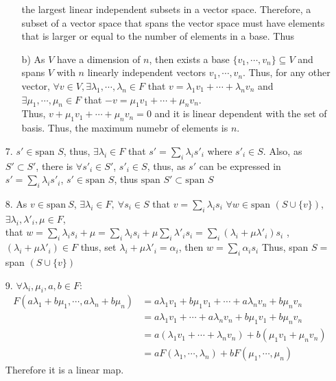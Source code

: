 \documentclass{article}
\begin{document}
\begin{itemize}
\begin{itemize}
    the largest linear independent subsets in a vector space. Therefore, a subset of a vector space that spans the vector space must have elements that is larger or equal to the
    number of elements in a base. Thus
    \item [b)] As \(V\) have a dimension of \(n\), then exists a base \(\{v_1,\cdots,v_n\}\subseteq V\) and spans \(V\) with \(n\) linearly independent vectors \(v_1,\cdots,v_n\).
    Thus, for any other vector, \(\forall v\in V,\exists \lambda_1,\cdots,\lambda_n\in F\) that \(v=\lambda_1v_1+\cdots+\lambda_nv_n\)
    and \(\exists \mu_1,\cdots,\mu_n\in F\) that \(-v=\mu_1v_1+\cdots+\mu_nv_n\).\\ Thus, \(v+\mu_1v_1+\cdots+\mu_nv_n=0\) and it is linear dependent with the set of basis. Thus, the maximum numebr of elements is \(n\).

\end{itemize}
    \item [7.] \(s' \in \text{span }S\), thus, \(\exists \lambda_i\in F\) that \(s' = \sum_i\lambda_i s'_i\) where \(s'_i\in S\). Also, as \(S'\subset S'\), there is \(\forall s'_i\in S'\), \(s'_i\in S\), thus, as \(s'\)
    can be expressed in \(s' = \sum_i\lambda_i s'_i\), \(s'\in \text{span }S\), thus \(\text{span }S'\subset\text{span }S\)
    \item [8.] As \(v\in \text{span}  \ S\), \(\exists \lambda_i\in F,\ \forall s_i \in S\) that \(v = \sum_i \lambda_is_i\)
    \(\forall w\in \text{span } (S\cup \{v\})\), \(\exists \lambda_i,\lambda'_i,\mu\in F\), \\
    that \(w=\sum_i\lambda_is_i + \mu  = \sum_i\lambda_is_i+\mu\sum_i\lambda'_is_i=\sum_i(\lambda_i+\mu\lambda'_i)s_i\)
    , \((\lambda_i+\mu\lambda'_i)\in F\) thus, set \(\lambda_i+\mu\lambda'_i=\alpha_i\), then \(w = \sum_i \alpha_is_i\) Thus, span \(S=\)span \((S\cup \{v\})\)
    
    \item [9.] \(\forall \lambda_i,\mu_i,a,b\in F\):
    \begin{align*}
        F(a\lambda_1+b\mu_1,\cdots,a\lambda_n+b\mu_n)&=a\lambda_1v_1+b\mu_1v_1+\cdots+a\lambda_nv_n+b\mu_nv_n\\
        &=a\lambda_1v_1+\cdots+a\lambda_nv_n + b\mu_1v_1+b\mu_nv_n\\
        &=a(\lambda_1v_1+\cdots+\lambda_nv_n) + b(\mu_1v_1+\mu_nv_n)\\
        &=aF(\lambda_1,\cdots,\lambda_n) + bF(\mu_1,\cdots,\mu_n)
    \end{align*}
    Therefore it is a linear map.
\end{itemize}
\end{document}
